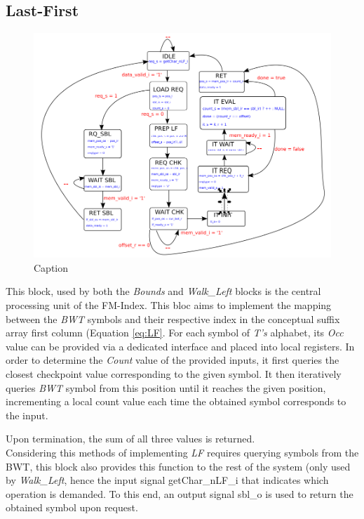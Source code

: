 \subsection{Last-First}

\begin{figure}[H]
    \centering
    \includegraphics[scale = 0.5]{Figures/LF_FSM.png}
    \caption{Caption}
    \label{fig:lf_fsm}
\end{figure}
\vspace*{8mm}



This block, used by both the \textsl{Bounds} and \textsl{Walk\_Left} blocks is the central processing unit of the FM-Index. This bloc aims to implement the mapping between the \textsl{BWT} symbols and their respective index in the conceptual suffix array first column (Equation \ref{eq:LF}. For each symbol of \textsl{T's} alphabet, its \textsl{Occ} value can be provided via a dedicated interface and placed into local registers. In order to determine the \textsl{Count} value of the provided inputs, it first queries the closest checkpoint value corresponding to the given symbol. It then iteratively queries \textsl{BWT} symbol from this position until it reaches the given position, incrementing a local count value each time the obtained symbol corresponds to the input.

Upon termination, the sum of all three values is returned. \\

Considering this methods of implementing \textsl{LF} requires querying symbols from the BWT, this block also provides this function to the rest of the system (only used by \textsl{Walk\_Left}, hence the input signal \textrm{getChar\_nLF\_i} that indicates which operation is demanded. To this end, an output signal \textrm{sbl\_o} is used to return the obtained symbol upon request.


